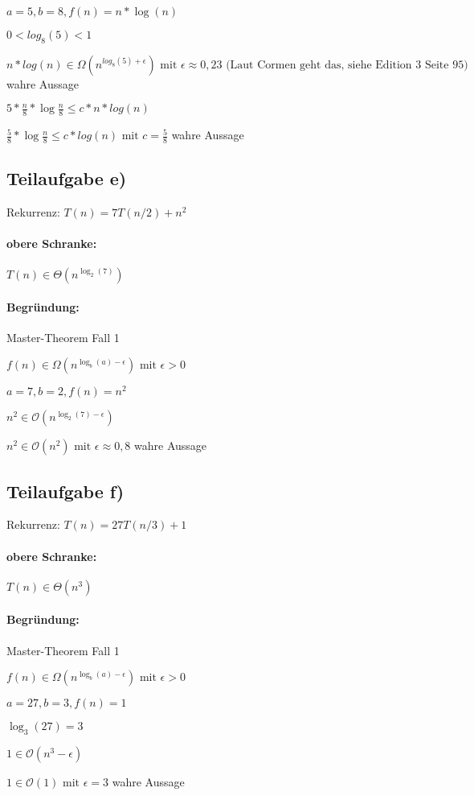 \documentclass[12pt]{scrartcl}%
\theoremstyle{nonumberplain}
\newcommand{\bO}[1]{\mathcal O(#1)}
\newcommand{\bT}[1]{\Theta (#1)}
\newcommand{\bOg}[1]{\Omega (#1)}
\begin{document}
$a=5, b=8, f(n)=n*\log (n)$

$0 < log_8 (5) < 1$

$n * log (n) \in \bOg{n^{log_8 (5) + \epsilon}} \text{ mit } \epsilon \approx 0,23 \text{ (Laut Cormen geht das, siehe Edition 3 Seite 95)}$  wahre Aussage

$5*\frac{n}{8} * \log{\frac{n}{8}} \le c * n * log(n)$

$\frac{5}{8} * \log{\frac{n}{8}} \le c * log(n) \text{ mit } c=\frac{5}{8}$ wahre Aussage

\subsection*{Teilaufgabe e)}
Rekurrenz: $ T(n) = 7T(n/2) + n^2 $

\paragraph{obere Schranke:} $ T(n) \in \bT{n^{\log_2(7)}} $

\paragraph{Begründung:} Master-Theorem Fall 1

$f(n) \in \bOg{n^{\log_b (a) - \epsilon}} \text{ mit } \epsilon > 0 $

$a=7,b=2, f(n) = n^2$

$n^2 \in \bO{n^{\log_2 (7) - \epsilon}}$

$n^2 \in \bO{n^2} \text{ mit } \epsilon \approx 0,8$ wahre Aussage

\newpage

\subsection*{Teilaufgabe f)}
Rekurrenz: $ T(n) = 27T(n/3) + 1 $

\paragraph{obere Schranke:} $ T(n) \in \bT{n^3} $

\paragraph{Begründung:} Master-Theorem Fall 1

$f(n) \in \bOg{n^{\log_b (a) - \epsilon}} \text{ mit } \epsilon > 0 $

$a=27, b=3, f(n) = 1$

$\log_3 (27) = 3$

$1 \in \bO{n^3-\epsilon}$

$1 \in \bO{1} \text{ mit } \epsilon = 3$ wahre Aussage
\end{document}
